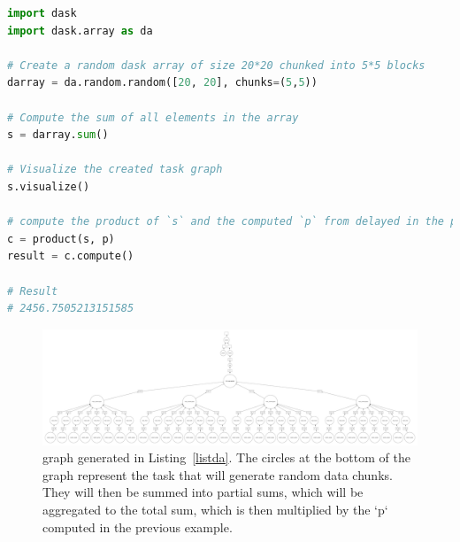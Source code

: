 \begin{lstlisting}[float=h!, label=listda, language=python, caption=Dask example using the Dask.array submodule]
import dask
import dask.array as da

# Create a random dask array of size 20*20 chunked into 5*5 blocks 
darray = da.random.random([20, 20], chunks=(5,5))

# Compute the sum of all elements in the array 
s = darray.sum()

# Visualize the created task graph 
s.visualize()

# compute the product of `s` and the computed `p` from delayed in the previous example
c = product(s, p)
result = c.compute()

# Result 
# 2456.7505213151585

\end{lstlisting}

\begin{figure}[th!]\centering
\includegraphics[scale=0.1, angle=90]{figures/func.pdf}
\caption{\dask graph generated in Listing~\ref{listda}. The circles at the bottom of the graph represent the task that will generate random data chunks. They will then be summed into partial sums, which will be aggregated to the total sum, which is then multiplied by the `p` computed in the previous example.}
\label{figda}
\end{figure}


